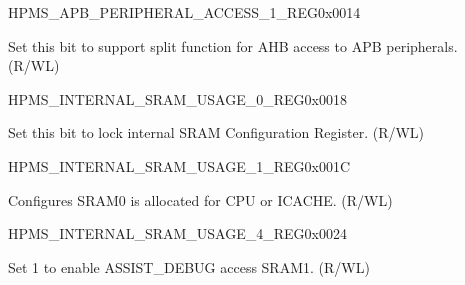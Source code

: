 \begin{register}{H}{PMS\_APB\_PERIPHERAL\_ACCESS\_1\_REG}{0x0014}\label{regdesc:PMSAPBPERIPHERALACCESS1REG}
%
%
\regnewline%
\begin{regdesc}\begin{reglist}
\label{fielddesc:PMSAPBPERIPHERALACCESSSPLITBURST}\item [PMS\_APB\_PERIPHERAL\_ACCESS\_SPLIT\_BURST] Set this bit to support split function for AHB access to APB peripherals. (R/WL)
\end{reglist}\end{regdesc}
\end{register}


\begin{register}{H}{PMS\_INTERNAL\_SRAM\_USAGE\_0\_REG}{0x0018}\label{regdesc:PMSINTERNALSRAMUSAGE0REG}
%
%
\regnewline%
\begin{regdesc}\begin{reglist}
\label{fielddesc:PMSINTERNALSRAMUSAGELOCK}\item [PMS\_INTERNAL\_SRAM\_USAGE\_LOCK] Set this bit to lock internal SRAM Configuration Register. (R/WL)
\end{reglist}\end{regdesc}
\end{register}


\begin{register}{H}{PMS\_INTERNAL\_SRAM\_USAGE\_1\_REG}{0x001C}\label{regdesc:PMSINTERNALSRAMUSAGE1REG}
%
%
%
\regnewline%
\begin{regdesc}\begin{reglist}
\label{fielddesc:PMSINTERNALSRAMUSAGECPUCACHE}\item [PMS\_INTERNAL\_SRAM\_USAGE\_CPU\_CACHE] Configures SRAM0 is allocated for CPU or ICACHE. (R/WL)
\end{reglist}\end{regdesc}
\end{register}


\begin{register}{H}{PMS\_INTERNAL\_SRAM\_USAGE\_4\_REG}{0x0024}\label{regdesc:PMSINTERNALSRAMUSAGE4REG}
%
%
\regnewline%
\begin{regdesc}\begin{reglist}
\label{fielddesc:PMSINTERNALSRAMUSAGELOGSRAM}\item [PMS\_INTERNAL\_SRAM\_USAGE\_LOG\_SRAM] Set 1 to enable ASSIST\_DEBUG access SRAM1. (R/WL)
\end{reglist}\end{regdesc}
\end{register}


